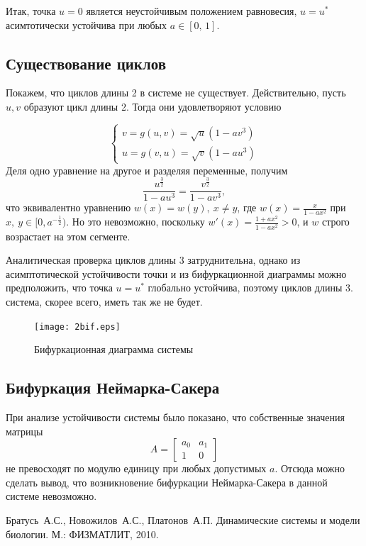 \documentclass[16pt]{article}
\begin{document}
Итак, точка $u = 0$ является неустойчивым положением равновесия, $u = u^*$ асимтотически устойчива при 
любых $a \in [0,\,1]$.

\subsection{Существование циклов}

Покажем, что циклов длины 2 в системе не существует. Действительно, пусть $u, v$ образуют цикл длины 2.
Тогда они удовлетворяют условию

\[
\begin{cases}
v = g(u, v) = \sqrt{u}(1-av^3)\\
u = g(v, u) = \sqrt{v}(1-au^3)
\end{cases}
\]
Деля одно уравнение на другое и разделяя переменные, получим
$$ \dfrac{u^{\frac32}}{1-au^3} = \dfrac{v^{\frac32}}{1-av^3},$$
что эквивалентно уравнению $w(x) = w(y), \ x \not= y$, где $w(x) = \frac{x}{1-ax^2}$ при $x,\ y \in [0, a^{-\frac12})$.
Но это невозможно, поскольку $w'(x) = \frac{1+ax^2}{1-ax^2} > 0$, и $w$ строго возрастает на этом сегменте.

Аналитическая проверка циклов длины 3 затруднительна, однако из асимптотической устойчивости точки и из
бифуркационной диаграммы можно предположить, что точка $u = u^*$ глобально устойчива, поэтому циклов длины 3.
система, скорее всего, иметь так же не будет.

\begin{figure}[h]
\center
\texttt{[image: 2bif.eps]}
\caption{Бифуркационная диаграмма системы}
\end{figure}

\newpage
\subsection{Бифуркация Неймарка-Сакера}
При анализе устойчивости системы было показано, что собственные значения матрицы
$$A = \begin{bmatrix} a_0 & a_1 \\ 1 & 0 \end{bmatrix}$$
не превосходят по модулю единицу при любых допустимых $a$. Отсюда можно сделать вывод, что возникновение
бифуркации Неймарка-Сакера в данной системе невозможно.
\newpage
\begin{thebibliography}{0}
	Братусь~А.С., Новожилов~А.С., Платонов~А.П. Динамические системы и модели биологии. М.: ФИЗМАТЛИТ, 2010. 
\end{thebibliography}
\end{document}
